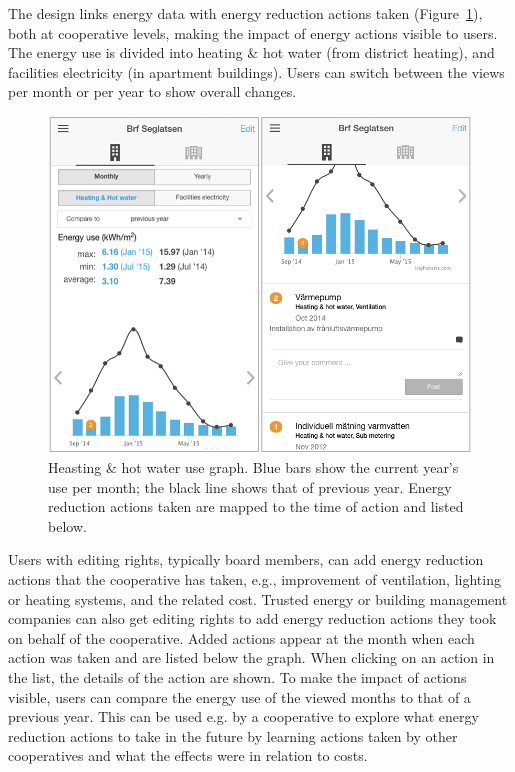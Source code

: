 The design links energy data with energy reduction actions taken (Figure~\ref{fig:Figure201_Actions}), both at cooperative levels, making the impact of energy actions visible to users. The energy use is divided into heating \& hot water (from district heating), and facilities electricity (in apartment buildings). Users can switch between the views per month or per year to show overall changes. %
%
\begin{figure}[h!]
	\centering
	\includegraphics[width=1\linewidth]{img/Figure201_Actions.png}
	\caption{Heasting \& hot water use graph. Blue bars show the current year's use per month; the black line shows that of previous year. Energy reduction actions taken are mapped to the time of action and listed below.}
	\label{fig:Figure201_Actions}
\end{figure}
%
Users with editing rights, typically board members, can  add energy reduction actions that the cooperative has taken, e.g., improvement of ventilation, lighting or heating systems, 
and the related cost.
Trusted energy or building management companies can also get editing rights to add energy reduction actions they took on behalf of the cooperative. 
Added actions appear at the month when each action was taken and are listed below the graph. When clicking on an action in the list, the details of the action are shown.
% 
To make the impact of actions visible, users can compare the energy use of the viewed months to that of a previous year. This can be used e.g. by a cooperative to explore what energy reduction actions to take in the future by learning actions taken by other cooperatives and what the effects were in relation to costs.

